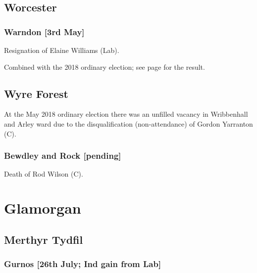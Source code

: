 \documentclass[a4paper,openany]{book}
\begin{document}
\begin{resultsiii}
\subsection*{Worcester}

\subsubsection*{Warndon \hspace*{\fill}\nolinebreak[1]%
\enspace\hspace*{\fill}
[3rd May]}


Resignation of Elaine Williams (Lab).

Combined with the 2018 ordinary election; see page \pageref{WarndonWorcester} for the result.

\subsection*{Wyre Forest}

At the May 2018 ordinary election there was an unfilled vacancy in Wribbenhall and Arley ward due to the disqualification (non-attendance) of Gordon Yarranton (C).

\subsubsection*{Bewdley and Rock \hspace*{\fill}\nolinebreak[1]%
\enspace\hspace*{\fill}
[pending]}


Death of Rod Wilson (C).

\section{Glamorgan}

\subsection*{Merthyr Tydfil}

\subsubsection*{Gurnos \hspace*{\fill}\nolinebreak[1]%
\enspace\hspace*{\fill}
[26th July; Ind gain from Lab]}


\end{resultsiii}
\end{document}
